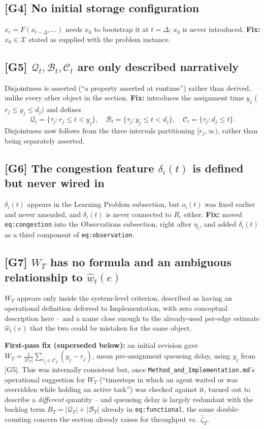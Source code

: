 \documentclass[11pt]{article}
\begin{document}
\subsection*{[G4] No initial storage configuration}
$x_t = F(x_{t-\Delta}, \ldots)$ needs $x_0$ to bootstrap it at $t=\Delta$;
$x_0$ is never introduced. \textbf{Fix:} $x_0 \in \mathcal{X}$ stated as
supplied with the problem instance.

\subsection*{[G5] \texorpdfstring{$\mathcal{Q}_t, \mathcal{B}_t, \mathcal{C}_t$}{Qt, Bt, Ct} are only described narratively}
Disjointness is asserted (``a property asserted at runtime'') rather than
derived, unlike every other object in the section. \textbf{Fix:} introduces
the assignment time $y_j$ ($r_j \le y_j \le d_j$) and defines
\[
\mathcal{Q}_t = \{\tau_j : r_j \le t < y_j\}, \quad
\mathcal{B}_t = \{\tau_j : y_j \le t < d_j\}, \quad
\mathcal{C}_t = \{\tau_j : d_j \le t\}.
\]
Disjointness now follows from the three intervals partitioning
$[r_j,\infty)$, rather than being separately asserted.

\subsection*{[G6] The congestion feature \texorpdfstring{$\delta_i(t)$}{delta\_i(t)} is defined but never wired in}
$\delta_i(t)$ appears in the Learning Problem subsection, but $o_i(t)$ was
fixed earlier and never amended, and $\delta_i(t)$ is never connected to
$R_i$ either. \textbf{Fix:} moved \texttt{eq:congestion} into the
Observations subsection, right after $\eta_i$, and added $\delta_i(t)$ as a
third component of \texttt{eq:observation}.

\subsection*{[G7] \texorpdfstring{$W_T$}{WT} has no formula and an ambiguous relationship to \texorpdfstring{$\hat{w}_t(e)$}{what(e)}}
$W_T$ appears only inside the system-level criterion, described as having an
operational definition deferred to Implementation, with zero conceptual
description here -- and a name close enough to the already-used per-edge
estimate $\hat{w}_t(e)$ that the two could be mistaken for the same object.

\textbf{First-pass fix (superseded below):} an initial revision gave
$W_T = \frac{1}{|\mathcal{C}_T|}\sum_{\tau_j \in \mathcal{C}_T}(y_j - r_j)$,
mean pre-assignment queueing delay, using $y_j$ from [G5]. This was internally
consistent but, once \texttt{Method\_and\_Implementation.md}'s operational
suggestion for $W_T$ (``timesteps in which an agent waited or was overridden
while holding an active task'') was checked against it, turned out to describe
a \emph{different} quantity -- and queueing delay is largely redundant with the
backlog term $B_T = |\mathcal{Q}_T|+|\mathcal{B}_T|$ already in
\texttt{eq:functional}, the same double-counting concern the section already
raises for throughput vs.\ $\bar\zeta_T$.
\end{document}
